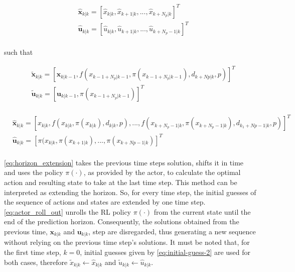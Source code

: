 \begin{equation}\label{eq:initial-guess-2}
	\begin{aligned}
		&\hat{\mathbf{x}}_{k|k} = [\hat{x}_{k|k},\hat{x}_{k+1|k},...,\hat{x}_{k + N_p|k}]^T \\ 
		&\hat{\mathbf{u}}_{k|k} = [\hat{u}_{k|k},\hat{u}_{k + 1|k},...,\hat{u}_{k + N_p - 1|k}]^T\\ 
	\end{aligned}
\end{equation}

such that

 \begin{equation}\label{eq:horizon_extension}
 	\begin{aligned}
 		&\tilde{\mathbf{x}}_{k|k} = [\mathbf{x}_{k|k-1},f(x_{k-1 + N_p|k-1}, \pi(x_{k-1 + N_p|k-1}), d_{k+Np|k},p)]^T\\ 
 		&\tilde{\mathbf{u}}_{k|k} = [\mathbf{u}_{k|k-1},\pi(x_{k-1 + N_p|k-1})]^T\\
 	\end{aligned}
 \end{equation}

\begin{equation}\label{eq:actor_roll_out}
	\begin{aligned}
		&\hat{\mathbf{x}}_{k|k} = [x_{k|k},f(x_{k|k},\pi(x_{k|k}),d_{k|k},p),..., f(x_{k+N_p-1|k}, \pi(x_{k + N_p-1|k}), d_{k_1 + Np-1|k},p)]^T \\ 
		&\hat{\mathbf{u}}_{k|k} = [\pi(x_{k|k},\pi(x_{k+1|k}),...,\pi(x_{k+Np-1|k})]^T \\ 
	\end{aligned}
	\end{equation}

\autoref{eq:horizon_extension} takes the previous time steps solution, shifts it in time and uses the policy $\pi(\cdot)$, as provided by the actor, to calculate the optimal action and resulting state to take at the last time step. This method can be interpreted as extending the horizon. So, for every time step, the initial guesses of the sequence of actions and states are extended by one time step. \autoref{eq:actor_roll_out} unrolls the RL policy $\pi(\cdot)$ from the current state until the end of the prediction horizon. Consequently, the solutions obtained from the previous time, $\mathbf{x}_{k|k}$ and $\mathbf{u}_{k|k}$, step are disregarded, thus generating a new sequence without relying on the previous time step’s solutions. It must be noted that, for the first time step, $k=0$, initial guesses given by \autoref{eq:initial-guess-2} are used for both cases, therefore $\tilde{x}_{k|k} \leftarrow \hat{x}_{k|k}$ and $\tilde{u}_{k|k} \leftarrow \hat{u}_{k|k}$.

